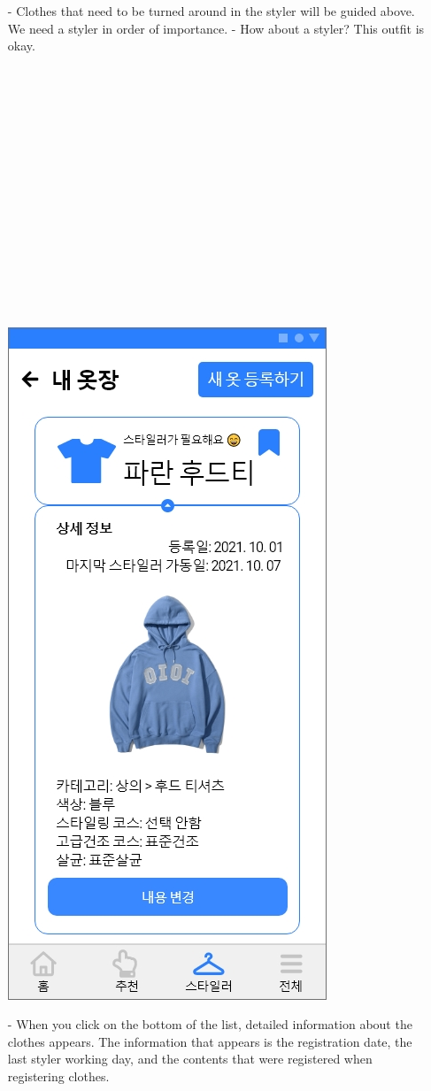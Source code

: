 \documentclass[conference]{IEEEtran}
\begin{document}
\begin{enumerate}
\begin{enumerate}
 \item[-]Clothes that need to be turned around in the styler will be guided above. We need a styler in order of importance. - How about a styler? This outfit is okay. \\\\\\\\\\\\\\\\\\\\\\\\\\\\\\\\
 
 \break
 
 \centerline{\includegraphics[scale=0.32]{assets/내 옷장2.jpg}} 
 \item[-] When you click on the bottom of the list, detailed information about the clothes appears. The information that appears is the registration date, the last styler working day, and the contents that were registered when registering clothes.\\\\
 \end{enumerate}
 

\end{enumerate}
\end{document}
